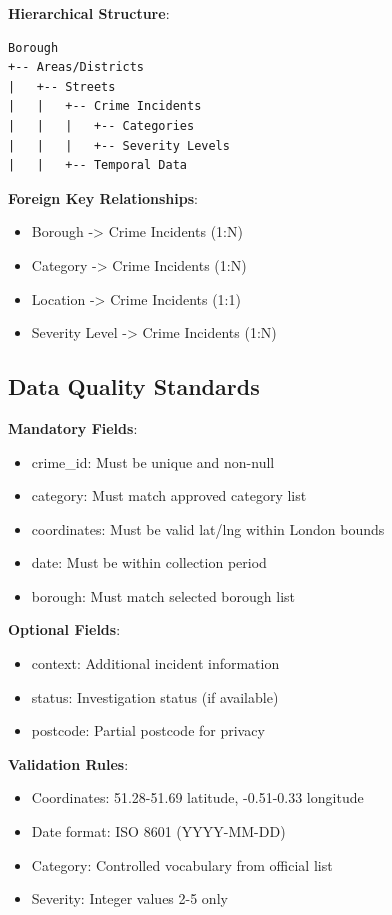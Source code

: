 \documentclass[12pt,a4paper]{article}
\begin{document}
\textbf{Hierarchical Structure}:
\begin{verbatim}
Borough
+-- Areas/Districts
|   +-- Streets
|   |   +-- Crime Incidents
|   |   |   +-- Categories
|   |   |   +-- Severity Levels
|   |   +-- Temporal Data
\end{verbatim}

\textbf{Foreign Key Relationships}:
\begin{itemize}
    \item Borough -> Crime Incidents (1:N)
    \item Category -> Crime Incidents (1:N)
    \item Location -> Crime Incidents (1:1)
    \item Severity Level -> Crime Incidents (1:N)
\end{itemize}

\subsection{Data Quality Standards}

\textbf{Mandatory Fields}:
\begin{itemize}
    \item crime\_id: Must be unique and non-null
    \item category: Must match approved category list
    \item coordinates: Must be valid lat/lng within London bounds
    \item date: Must be within collection period
    \item borough: Must match selected borough list
\end{itemize}

\textbf{Optional Fields}:
\begin{itemize}
    \item context: Additional incident information
    \item status: Investigation status (if available)
    \item postcode: Partial postcode for privacy
\end{itemize}

\textbf{Validation Rules}:
\begin{itemize}
    \item Coordinates: 51.28-51.69 latitude, -0.51-0.33 longitude
    \item Date format: ISO 8601 (YYYY-MM-DD)
    \item Category: Controlled vocabulary from official list
    \item Severity: Integer values 2-5 only
\end{itemize}
\end{document}
